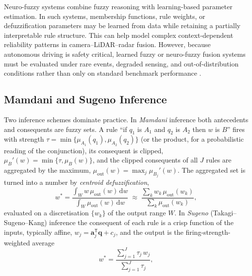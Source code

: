 Neuro-fuzzy systems combine fuzzy reasoning with learning-based parameter estimation. In such systems, membership functions, rule weights, or defuzzification parameters may be learned from data while retaining a partially interpretable rule structure. This can help model complex context-dependent reliability patterns in camera--LiDAR--radar fusion. However, because autonomous driving is safety critical, learned fuzzy or neuro-fuzzy fusion systems must be evaluated under rare events, degraded sensing, and out-of-distribution conditions rather than only on standard benchmark performance \cite{khaleghi_multisensor_2013, baltrusaitis_multimodal_2019}.

\subsection{Mamdani and Sugeno Inference}
\label{subsec:mamdani-sugeno}
Two inference schemes dominate practice. In \emph{Mamdani} inference \cite{mamdani1975_fuzzy} both antecedents and consequents are fuzzy sets. A rule ``if $q_1$ is $A_1$ and $q_2$ is $A_2$ then $w$ is $B$'' fires with strength $\tau=\min\{\mu_{A_1}(q_1),\mu_{A_2}(q_2)\}$ (or the product, for a probabilistic reading of the conjunction), its consequent is clipped, $\mu_{B}'(w)=\min\{\tau,\mu_{B}(w)\}$, and the clipped consequents of all $J$ rules are aggregated by the maximum, $\mu_{\mathrm{out}}(w)=\max_j\mu_{B_j}'(w)$. The aggregated set is turned into a number by \emph{centroid defuzzification},
\begin{equation}
w^{\ast}=\frac{\displaystyle\int_{W} w\,\mu_{\mathrm{out}}(w)\,\mathrm{d}w}{\displaystyle\int_{W}\mu_{\mathrm{out}}(w)\,\mathrm{d}w}
\;\approx\;
\frac{\sum_{k} w_k\,\mu_{\mathrm{out}}(w_k)}{\sum_{k}\mu_{\mathrm{out}}(w_k)},
\label{eq:centroid-defuzzification}
\end{equation}
evaluated on a discretisation $\{w_k\}$ of the output range $W$. In \emph{Sugeno} (Takagi--Sugeno--Kang) inference \cite{takagi1985_sugeno} the consequent of each rule is a crisp function of the inputs, typically affine, $w_j=\mathbf{a}_j^{\mathsf T}\mathbf{q}+c_j$, and the output is the firing-strength-weighted average
\begin{equation}
w^{\ast}=\frac{\sum_{j=1}^{J}\tau_j\,w_j}{\sum_{j=1}^{J}\tau_j},
\label{eq:sugeno-output}
\end{equation}
